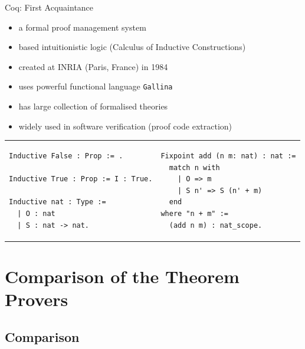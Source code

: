 \documentclass[aspectratio=169, fleqn]{beamer}
\begin{document}
\begin{frame}[fragile]{Coq: First Acquaintance}

\vspace{10pt}
\begin{itemize}
  \item a formal proof management system
  \item based intuitionistic logic \textcolor{dkgray}{ (Calculus of Inductive Constructions) }
  \item created at INRIA (Paris, France) in 1984
  \item \textcolor{dkgray}{ uses powerful functional language \texttt{Gallina} }
  \item \textcolor{dkgray}{ has large collection of formalised theories }
  \item \textcolor{dkgray}{ widely used in software verification (proof code extraction) }
\end{itemize}


\begin{tabular}{p{.45\linewidth} p{.45\linewidth}}
\begin{lstlisting}[language=coq, caption={Definition of basic datatypes 
%in Isabelle:
}]
Inductive False : Prop := .

Inductive True : Prop := I : True.

Inductive nat : Type :=
  | O : nat
  | S : nat -> nat.
\end{lstlisting}
&

\begin{lstlisting}[language=isabelle,caption={Definition of addition over \texttt{nat}}]
Fixpoint add (n m: nat) : nat :=
  match n with
    | O => m
    | S n' => S (n' + m)
  end
where "n + m" :=
  (add n m) : nat_scope.
\end{lstlisting}
\end{tabular}

\end{frame}



\section{Comparison of the Theorem Provers}

\subsection{Comparison}
\end{document}
